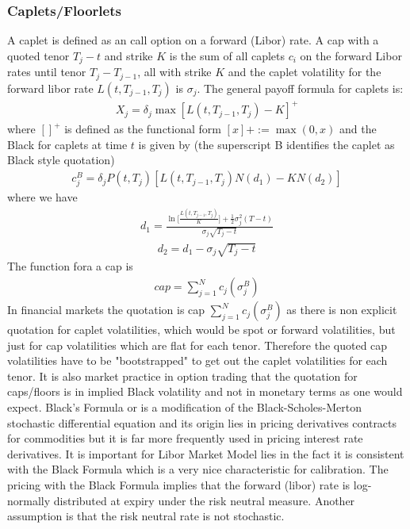 \documentclass[11pt]{article}
\numberwithin{equation}{subsection}
\begin{document}
\subsubsection{Caplets/Floorlets}
A caplet is defined as an call option on a forward (Libor) rate. A cap with a quoted tenor \(T_{j}-t\) and strike \(K\) is the sum of all caplets \(c_i\) on the forward Libor rates until tenor \(T_{j}-T_{j-1}\), all with strike \(K\) and the caplet volatility for the forward libor rate \(L(t, T_{j-1}, T_{j})\) is \(\sigma_{j}\). The general payoff formula for caplets is:
\begin{eqnarray}
X_j = \delta_{j} \max[L(t, T_{j-1}, T_j)-K]^{+}
\end{eqnarray}
where \([]^+\) is defined as the functional form \([x]+ := \max(0, x)\) and the Black for caplets at time \(t\) is given by (the superscript B identifies the caplet as Black style quotation)
\begin{eqnarray}
c_j^{B} = \delta_{j} P(t, T_{j}) [L(t, T_{j-1}, T_j)N(d_1) -K N(d_2)]
\end{eqnarray}
where we have 
\begin{eqnarray}
	d_1 = \frac{\ln\bigg[\frac{L(t, T_{j-1}, T_j)}{K}\bigg]+\frac{1}{2}\sigma_j^2(T-t)}{\sigma_j\sqrt{T_j-t}}
\end{eqnarray}
\begin{eqnarray}
	d_2 = d_1 - \sigma_j \sqrt{T_j-t}
\end{eqnarray}
The function fora a cap is
\begin{eqnarray}
	cap = \sum_{j=1}^{N} c_{j}(\sigma_{j}^{B})
\end{eqnarray}
In financial markets the quotation is cap \(\sum_{j=1}^{N} c_{j}(\sigma_{j}^{B})\) as there is non explicit quotation for caplet volatilities, which would be spot or forward volatilities, but just for cap volatilities which are flat for each tenor. Therefore the quoted cap volatilities have to be "bootstrapped" to get out the caplet volatilities for each tenor. It is also market practice in option trading that the quotation for caps/floors is in implied Black volatility and not in monetary terms as one would expect.
Black's Formula or is a modification of the Black-Scholes-Merton stochastic differential equation and its origin lies in pricing derivatives contracts for commodities but it is far more frequently used in pricing interest rate derivatives. It is important for Libor Market Model lies in the fact it is consistent with the Black Formula which is a very nice characteristic for calibration. The pricing with the Black Formula implies that the forward (libor) rate is log-normally distributed at expiry under the risk neutral measure. Another assumption is that the risk neutral rate is not stochastic.\\
\end{document}
